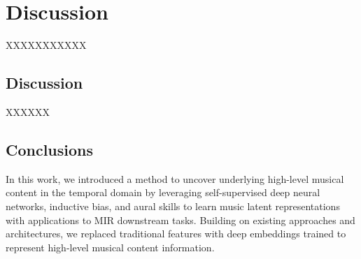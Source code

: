 \chapter{Discussion}

XXXXXXXXXXX

\section{Discussion}

XXXXXX

\section{Conclusions}

In this work, we introduced a method to uncover underlying high-level musical
content in the temporal domain by leveraging self-supervised deep neural networks, inductive bias, and aural skills to learn music latent representations with applications to MIR downstream tasks. Building on existing approaches and architectures, we replaced traditional features with deep embeddings trained to represent high-level musical content information.

\newpage


